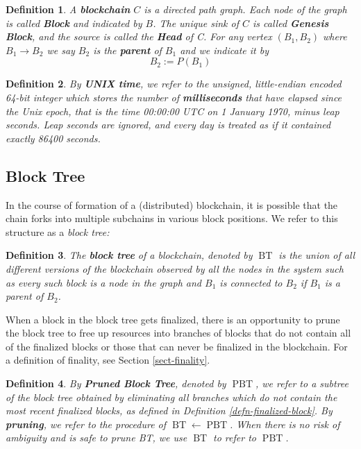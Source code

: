 \documentclass{book}
\newcommand{\assign}{:=}
\newcommand{\tmem}[1]{{\em #1\/}}
\newcommand{\tmop}[1]{\ensuremath{\operatorname{#1}}}
\newcommand{\tmstrong}[1]{\textbf{#1}}
\newcommand{\tmtextbf}[1]{{\bfseries{#1}}}
\newcommand{\tmtextit}[1]{{\itshape{#1}}}
\newtheorem{definition}{Definition}
\providecommand{\tmem}[1]{\tmtextit{#1}}
\providecommand{\tmop}[1]{\ensuremath{\mathrm{#1}}}
\providecommand{\tmstrong}[1]{\tmtextbf{#1}}
\providecommand{\tmtextbf}[1]{\tmtextbf{#1}}
\providecommand{\tmtextit}[1]{\tmtextit{#1}}
\newtheorem{definition}{Definition}
\begin{document}
\begin{definition}
  A {\tmstrong{blockchain}} $C$ is a directed path graph. Each node of the
  graph is called {\tmstrong{Block}} and indicated by {\tmstrong{$B$}}. The
  unique sink of $C$ is called {\tmstrong{Genesis Block}}, and the source is
  called the {\tmstrong{Head}} of C. For any vertex $(B_1, B_2)$ where $B_1
  \rightarrow B_2$ we say $B_2$ is the {\tmstrong{parent}} of $B_1$ and we
  indicate it by
  \[ B_2 \assign P (B_1) \]
\end{definition}

\begin{definition}
  \label{defn-unix-time}By {\tmstrong{UNIX time}}, we refer to the unsigned,
  little-endian encoded 64-bit integer which stores the number of
  {\tmstrong{milliseconds}} that have elapsed since the Unix epoch, that is
  the time 00:00:00 UTC on 1 January 1970, minus leap seconds. Leap seconds
  are ignored, and every day is treated as if it contained exactly 86400
  seconds.
\end{definition}

\subsection{Block Tree}

In the course of formation of a (distributed) blockchain, it is possible that
the chain forks into multiple subchains in various block positions. We refer
to this structure as a {\tmem{block tree:}}

\begin{definition}
  \label{defn-block-tree}The {\tmstrong{block tree}} of a blockchain, denoted
  by $\tmop{BT}$ is the union of all different versions of the blockchain
  observed by all the nodes in the system such as every such block is a node
  in the graph and $B_1$ is connected to $B_2$ if $B_1$ is a parent of $B_2$.
\end{definition}

When a block in the block tree gets finalized, there is an opportunity to
prune the block tree to free up resources into branches of blocks that do not
contain all of the finalized blocks or those that can never be finalized in
the blockchain. For a definition of finality, see Section \ref{sect-finality}.

\begin{definition}
  \label{defn-pruned-tree}By {\tmstrong{Pruned Block Tree}}, denoted by
  $\tmop{PBT}$, we refer to a subtree of the block tree obtained by
  eliminating all branches which do not contain the most recent finalized
  blocks, as defined in Definition \ref{defn-finalized-block}. By
  {\tmstrong{pruning}}, we refer to the procedure of $\tmop{BT} \leftarrow
  \tmop{PBT}$. When there is no risk of ambiguity and is safe to prune BT, we
  use $\tmop{BT}$ to refer to $\tmop{PBT}$.
\end{definition}
\end{document}
